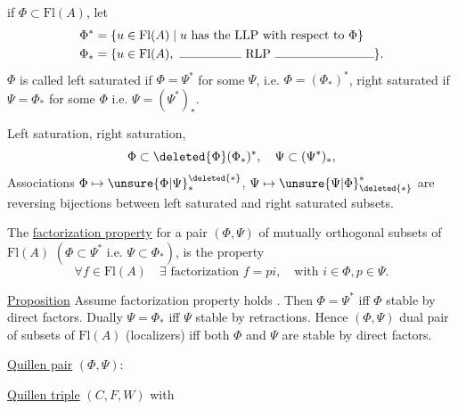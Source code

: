 if $\Phi\subset\mathrm{Fl}(A)$, let
\[
\begin{aligned}
\Phi^*&=\{u\in\mathrm{Fl}(A)\mid u\text{ has the LLP with respect to }\Phi\}\\
\Phi_*&=\{u\in\mathrm{Fl}(A),\ \text{\rule{5em}{.3pt}}\ \mathrm{RLP}\ \text{\rule{8em}{.3pt}}\}.
\end{aligned}
\]
$\Phi$ is called left saturated if $\Phi=\Psi^*$ for some $\Psi$, i.e. $\Phi=(\Phi_*)^*$,
\inserted{$\Psi$} right saturated if  $\Psi=\Phi_*$ for some $\Phi$ i.e. $\Psi=(\Psi^*)_*$.

Left saturation, right saturation,
\[
\Phi\subset\deleted{\Phi}(\Phi_*)^*,\quad \Psi\subset(\Psi^*)_*,
\]
Associations $\Phi\mapsto\unsure{\Phi|\Psi}_*^{\deleted{*}}$, $\Psi\mapsto\unsure{\Psi|\Phi}^{*}_{\deleted{*}}$ are  reversing bijections between left saturated and right saturated subsets.


The \uline{factorization property} for a pair $(\Phi,\Psi)$ of mutually orthogonal subsets of $\mathrm{Fl}(A)$ $(\Phi\subset\Psi^*\text{ i.e. }\Psi\subset\Phi_*)$, is the property 
\[
\forall f\in\mathrm{Fl}(A)\quad\exists\text{ factorization }f=pi,\quad\text{with }i\in\Phi,p\in\Psi.
\]

 
\uline{Proposition} Assume factorization property holds .
Then $\Phi=\Psi^*$ iff $\Phi$ stable by direct factors. Dually $\Psi=\Phi_*$ iff $\Psi$ stable by retractions. Hence $(\Phi,\Psi)$  dual pair of subsets of $\mathrm{Fl}(A)$ (localizers) iff   both $\Phi$ and $\Psi$ are stable by direct factors.

\uline{Quillen pair} $(\Phi,\Psi)$:

\uline{Quillen triple} $(C,F,W)$ with


